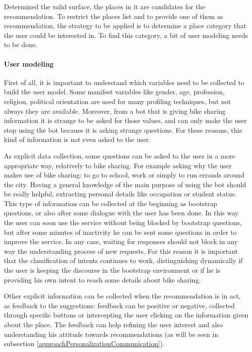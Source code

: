 Determined the valid surface, the places in it are candidates for the recommendation. To restrict the places list and to provide one of them as recommendation, the strategy to be applied is to determine a place category that the user could be interested in. To find this category, a bit of user modeling needs to be done.

\paragraph{User modeling}
First of all, it is important to understand which variables need to be collected to build the user model. Some manifest variables like gender, age, profession, religion, political orientation are used for many profiling techniques, but not always they are available. Moreover, from a bot that is giving bike sharing information it is strange to be asked for those values, and can only make the user stop using the bot because it is asking strange questions. For these reasons, this kind of information is not even asked to the user.

As explicit data collection, some questions can be asked to the user in a more appropriate way, relatively to bike sharing. For example asking why the user makes use of bike sharing: to go to school, work or simply to run errands around the city. Having a general knowledge of the main purpose of using the bot should be really helpful, extracting personal details like occupation or student status. This type of information can be collected at the beginning as bootstrap questions, or also after some dialogue with the user has been done. In this way the user can soon use the service without being blocked by bootstrap questions, but after some minutes of inactivity he can be sent some questions in order to improve the service. In any case, waiting for responses should not block in any way the understanding process of new requests. For this reason it is important that the classification of intents continues to work, distinguishing dynamically if the user is keeping the discourse in the bootstrap environment or if he is providing his own intent to reach some details about bike sharing. 

Other explicit information can be collected when the recommendation is in act, as feedback to the suggestions: feedback can be positive or negative, collected through specific buttons or intercepting the user clicking on the information given about the place. The feedback can help refining the user interest and also understanding his attitude towards recommendations (as will be seen in subsection \ref{approachPersonalizationCommunication}).

